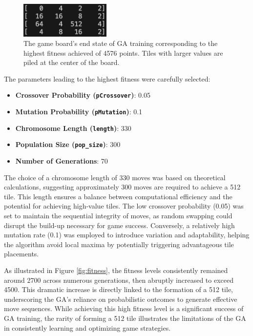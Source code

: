 \documentclass[11pt]{article}
\begin{document}
\begin{figure}[ht]
\centering
\includegraphics[width=0.4\textwidth]{4576board.png}
\caption{The game board's end state of GA training corresponding to the highest fitness achieved of 4576 points. Tiles with larger values are piled at the center of the board.}
\label{fig:4576endgame}
\end{figure}

\newpage
The parameters leading to the highest fitness were carefully selected:
\begin{itemize}
    \item \textbf{Crossover Probability (\texttt{pCrossover})}: 0.05
    \item \textbf{Mutation Probability (\texttt{pMutation})}: 0.1
    \item \textbf{Chromosome Length (\texttt{length})}: 330
    \item \textbf{Population Size (\texttt{pop\_size})}: 300
    \item \textbf{Number of Generations}: 70
\end{itemize}

The choice of a chromosome length of 330 moves was based on theoretical calculations, suggesting approximately 300 moves are required to achieve a 512 tile. This length ensures a balance between computational efficiency and the potential for achieving high-value tiles. The low crossover probability (0.05) was set to maintain the sequential integrity of moves, as random swapping could disrupt the build-up necessary for game success. Conversely, a relatively high mutation rate (0.1) was employed to introduce variation and adaptability, helping the algorithm avoid local maxima by potentially triggering advantageous tile placements.

As illustrated in Figure \ref{fig:fitness}, the fitness levels consistently remained around 2700 across numerous generations, then abruptly increased to exceed 4500. This dramatic increase is directly linked to the formation of a 512 tile, underscoring the GA's reliance on probabilistic outcomes to generate effective move sequences. While achieving this high fitness level is a significant success of GA training, the rarity of forming a 512 tile illustrates the limitations of the GA in consistently learning and optimizing game strategies.
\end{document}
